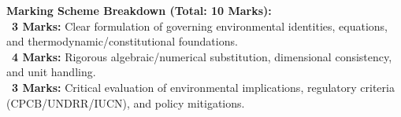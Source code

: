 \begin{solbox}
\end{solbox}

\begin{examinertip}
\textbf{Marking Scheme Breakdown (Total: 10 Marks):}\\
\textbullet\ \textbf{3 Marks:} Clear formulation of governing environmental identities, equations, and thermodynamic/constitutional foundations.\\
\textbullet\ \textbf{4 Marks:} Rigorous algebraic/numerical substitution, dimensional consistency, and unit handling.\\
\textbullet\ \textbf{3 Marks:} Critical evaluation of environmental implications, regulatory criteria (CPCB/UNDRR/IUCN), and policy mitigations.
\end{examinertip}
